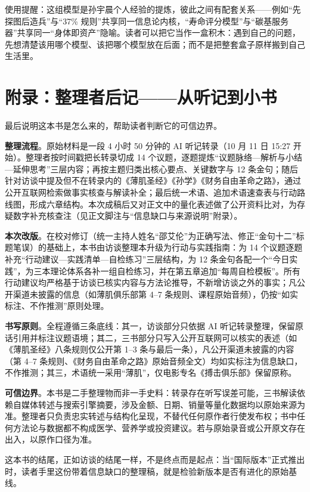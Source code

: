 使用提醒：这组模型是孙宇晨个人经验的提炼，彼此之间有配套关系------例如``先探图后造兵''与``37\%
规则''共享同一信息论内核，``寿命评分模型''与``碳基服务器''共享同一``身体即资产''隐喻。读者可以把它当作一盒积木：遇到自己的问题，先想清楚该用哪个模型、该把哪个模型放在后面；而不是把整套盒子原样搬到自己生活里。

\section{附录：整理者后记------从听记到小书}

最后说明这本书是怎么来的，帮助读者判断它的可信边界。

\textbf{整理流程}。原始材料是一段 4 小时 50 分钟的 AI 听记转录（10 月 11
日 15:27 开始）。整理者按时间戳把长转录切成 14
个议题，逐题提炼``议题脉络---解析与小结---延伸思考''三层内容；再按主题归类出核心要点、关键数字与
12
条金句；随后针对访谈中提及但不在转录内的《薄肌圣经》《孙学》《财务自由革命之路》，通过公开互联网检索做事实核查与解读补全；最后统一术语、追加术语速查表与行动路线图，形成六章结构。本次成稿后又对正文中的量化表述做了公开资料比对，为存疑数字补充核查注（见正文脚注与``信息缺口与来源说明''附录）。

\textbf{本次改版}。在校对修订（统一主持人姓名``邵艾伦''为正确写法、修正``金句十二''标题笔误）的基础上，本书由访谈整理本升级为行动与实践指南：为
14 个议题逐题补充``行动建议---实践清单---自检练习''三层结构，为 12
条金句各配一个``今日实践''，为三本理论体系各补一组自检练习，并在第五章追加``每周自检模板''。所有行动建议均严格基于访谈已核实内容与方法论推导，不新增访谈之外的事实；凡公开渠道未披露的信息（如薄肌俱乐部第
4--7 条规则、课程原始音频），仍按``如实标注、不作推测''原则处理。

\textbf{书写原则}。全程遵循三条底线：其一，访谈部分只依据 AI
听记转录整理，保留原话引用并标注议题语境；其二，三书部分只写入公开互联网可以核实的表述（如《薄肌圣经》八条规则仅公开第
1--3 条与最后一条），凡公开渠道未披露的内容（第 4--7
条规则、《财务自由革命之路》原始音频全文）均如实标注为信息缺口，不作推测；其三，术语统一采用``薄肌''，仅电影专名《搏击俱乐部》保留原称。

\textbf{可信边界}。本书是二手整理物而非一手史料：转录存在听写误差可能，三书解读依赖自媒体转述与搜索引擎摘要，涉及金额、日期、销量等量化数据均以原始来源为准。整理者只负责忠实转述与结构化呈现，不替代任何原作者行使发布权；书中任何方法论与数据都不构成医学、营养学或投资建议。若与原始录音或公开原文存在出入，以原作口径为准。

这本书的结尾，正如访谈的结尾一样，不是终点而是起点：当``国际版本''正式推出时，读者手里这份带着信息缺口的整理稿，就是检验新版本是否有进化的原始基线。

